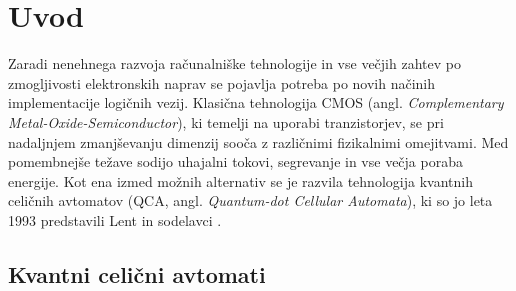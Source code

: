



\section{Uvod}
\label{g27:sec:uvod}

Zaradi nenehnega razvoja računalniške tehnologije in vse večjih zahtev po zmogljivosti elektronskih naprav se pojavlja potreba po novih načinih implementacije logičnih vezij. Klasična tehnologija CMOS (angl. \textit{Complementary Metal-Oxide-Semiconductor}), ki temelji na uporabi tranzistorjev, se pri nadaljnjem zmanjševanju dimenzij sooča z različnimi fizikalnimi omejitvami. Med pomembnejše težave sodijo uhajalni tokovi, segrevanje in vse večja poraba energije. Kot ena izmed možnih alternativ se je razvila tehnologija kvantnih celičnih avtomatov (QCA, angl. \textit{Quantum-dot Cellular Automata}), ki so jo leta 1993 predstavili Lent in sodelavci \cite{lent1993}.

\subsection{Kvantni celični avtomati}

